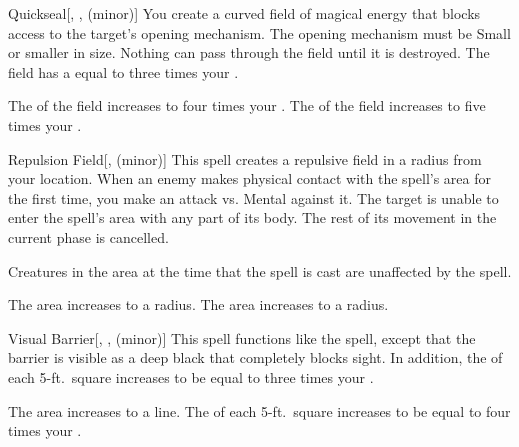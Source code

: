 \lowercase{\hypertarget{spell:Quickseal}{}}\label{spell:Quickseal}
\begin{freeability}[Rank 3]{\hypertarget{spell:Quickseal}{Quickseal}}[, ,  (minor)]
You create a curved field of magical energy that blocks access to the target's opening mechanism.
The opening mechanism must be Small or smaller in size.
Nothing can pass through the field until it is destroyed.
The field has a  equal to three times your .

\rankline
{} The  of the field increases to four times your .
 The  of the field increases to five times your .
\end{freeability}
\vspace{0.25em}



\lowercase{\hypertarget{spell:Repulsion Field}{}}\label{spell:Repulsion Field}
\begin{freeability}[Rank 3]{\hypertarget{spell:Repulsion Field}{Repulsion Field}}[,  (minor)]
This spell creates a repulsive field in a \areamed radius  from your location.
When an enemy makes physical contact with the spell's area for the first time, you make an attack vs. Mental against it.
\hit The target is unable to enter the spell's area with any part of its body.
The rest of its movement in the current phase is cancelled.

Creatures in the area at the time that the spell is cast are unaffected by the spell.

\rankline
{} The area increases to a \arealarge radius.
 The area increases to a \areahuge radius.
\end{freeability}
\vspace{0.25em}



\lowercase{\hypertarget{spell:Visual Barrier}{}}\label{spell:Visual Barrier}
\begin{freeability}[Rank 3]{\hypertarget{spell:Visual Barrier}{Visual Barrier}}[, ,  (minor)]
\targetrule
This spell functions like the  spell, except that the barrier is visible as a deep black that completely blocks sight.
In addition, the  of each 5-ft.\ square increases to be equal to three times your .

 The area increases to a \arealarge line.
 The  of each 5-ft.\ square increases to be equal to four times your .
\end{freeability}
\vspace{0.25em}



